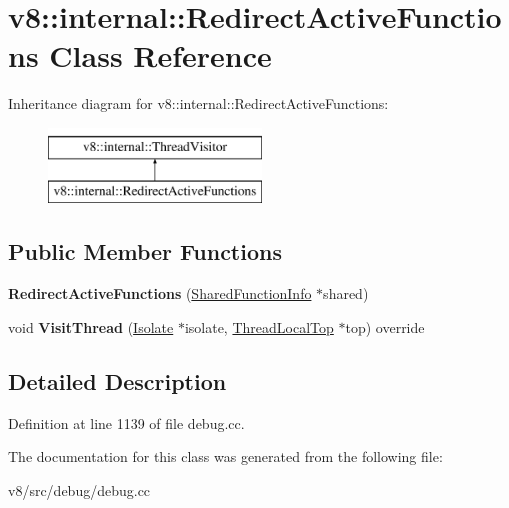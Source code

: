 \hypertarget{classv8_1_1internal_1_1RedirectActiveFunctions}{}\section{v8\+:\+:internal\+:\+:Redirect\+Active\+Functions Class Reference}
\label{classv8_1_1internal_1_1RedirectActiveFunctions}
Inheritance diagram for v8\+:\+:internal\+:\+:Redirect\+Active\+Functions\+:\begin{figure}[H]
\begin{center}
\leavevmode
\includegraphics[height=2.000000cm]{classv8_1_1internal_1_1RedirectActiveFunctions}
\end{center}
\end{figure}
\subsection*{Public Member Functions}
\begin{DoxyCompactItemize}
\item 
\mbox{\label{classv8_1_1internal_1_1RedirectActiveFunctions_a49bd4a9cd586bb21ad32225157cc9da2}} 
{\bfseries Redirect\+Active\+Functions} (\mbox{\hyperlink{classv8_1_1internal_1_1SharedFunctionInfo}{Shared\+Function\+Info}} $\ast$shared)
\item 
\mbox{\label{classv8_1_1internal_1_1RedirectActiveFunctions_a1983b531c36842734c1018e5e841a637}} 
void {\bfseries Visit\+Thread} (\mbox{\hyperlink{classv8_1_1internal_1_1Isolate}{Isolate}} $\ast$isolate, \mbox{\hyperlink{classv8_1_1internal_1_1ThreadLocalTop}{Thread\+Local\+Top}} $\ast$top) override
\end{DoxyCompactItemize}


\subsection{Detailed Description}


Definition at line 1139 of file debug.\+cc.



The documentation for this class was generated from the following file\+:\begin{DoxyCompactItemize}
\item 
v8/src/debug/debug.\+cc\end{DoxyCompactItemize}
